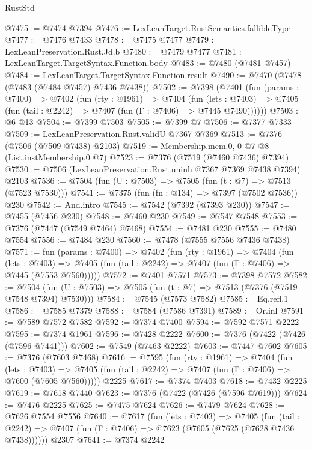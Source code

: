 \begin{lexlean}{RustStd}
\begin{coremodule}
@7475 := @7474 @7394
@7476 := LexLeanTarget.RustSemantics.fallibleType
@7477 := @7476 @7433
@7478 := @7475 @7477
@7479 := LexLeanPreservation.Rust.Jd.b
@7480 := @7479 @7477
@7481 := LexLeanTarget.TargetSyntax.Function.body
@7483 := @7480 (@7481 @7457)
@7484 := LexLeanTarget.TargetSyntax.Function.result
@7490 := @7470 (@7478 (@7483 (@7484 @7457) @7436 @7438))
@7502 := @7398
    (@7401
      (fun (params : @7400) =>
      @7402
        (fun (rty : @1961) =>
        @7404
          (fun (lets : @7403) =>
          @7405 (fun (tail : @2242) => @7407 (fun (Γ : @7406) => @7445 @7490))))))
@7503 := @6 @13
@7504 := @7399 @7503
@7505 := @7399 @7
@7506 := @7377 @7333
@7509 := LexLeanPreservation.Rust.validU @7367 @7369
@7513 := @7376 (@7506 (@7509 @7438) @2103)
@7519 := Membership.mem.{0, 0} @7 @8 (List.instMembership.{0} @7)
@7523 := @7376 (@7519 (@7460 @7436) @7394)
@7530 := @7506 (LexLeanPreservation.Rust.uninh @7367 @7369 @7438 @7394) @2103
@7536 := @7504 (fun (U : @7503) => @7505 (fun (t : @7) => @7513 (@7523 @7530)))
@7541 := @7375 (fun (fn : @134) => @7397 (@7502 @7536)) @230
@7542 := And.intro
@7545 := @7542 (@7392 (@7393 @230))
@7547 := @7455 (@7456 @230)
@7548 := @7460 @230
@7549 := @7547 @7548
@7553 := @7376 (@7447 (@7549 @7464) @7468)
@7554 := @7481 @230
@7555 := @7480 @7554
@7556 := @7484 @230
@7560 := @7478 (@7555 @7556 @7436 @7438)
@7571 := fun (params : @7400) =>
  @7402
    (fun (rty : @1961) =>
    @7404
      (fun (lets : @7403) =>
      @7405 (fun (tail : @2242) => @7407 (fun (Γ : @7406) => @7445 (@7553 @7560)))))
@7572 := @7401 @7571
@7573 := @7398 @7572
@7582 := @7504 (fun (U : @7503) => @7505 (fun (t : @7) => @7513 (@7376 (@7519 @7548 @7394) @7530)))
@7584 := @7545 (@7573 @7582)
@7585 := Eq.refl.{1}
@7586 := @7585 @7379
@7588 := @7584 (@7586 @7391)
@7589 := Or.inl
@7591 := @7589 @7572 @7582
@7592 := @7374 @7400
@7594 := @7592 @7571 @2222
@7595 := @7374 @1961
@7596 := @7428 @2222
@7600 := @7376 (@7422 (@7426 (@7596 @7441)))
@7602 := @7549 (@7463 @2222)
@7603 := @7447 @7602
@7605 := @7376 (@7603 @7468)
@7616 := @7595
    (fun (rty : @1961) =>
    @7404
      (fun (lets : @7403) =>
      @7405 (fun (tail : @2242) => @7407 (fun (Γ : @7406) => @7600 (@7605 @7560)))))
    @2225
@7617 := @7374 @7403
@7618 := @7432 @2225
@7619 := @7618 @7440
@7623 := @7376 (@7422 (@7426 (@7596 @7619)))
@7624 := @7476 @2225
@7625 := @7475 @7624
@7626 := @7479 @7624
@7628 := @7626 @7554 @7556
@7640 := @7617
    (fun (lets : @7403) =>
    @7405
      (fun (tail : @2242) => @7407 (fun (Γ : @7406) => @7623 (@7605 (@7625 (@7628 @7436 @7438))))))
    @2307
@7641 := @7374 @2242

\end{coremodule}
\end{lexlean}
